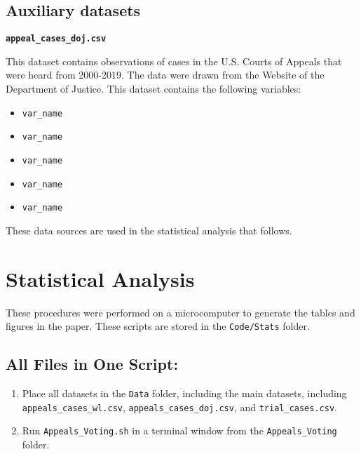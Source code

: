 \documentclass[11pt]{paper}
\begin{document}
\subsection*{Auxiliary datasets}

\noindent\textbf{\texttt{appeal\_cases\_doj.csv}}

This dataset contains observations of cases in the U.S. Courts of Appeals
that were heard from 2000-2019.  
The data were drawn from the Website of the Department of Justice. 
This dataset contains the following variables:

\begin{itemize}

\item \texttt{var\_name} 
\item \texttt{var\_name} 
\item \texttt{var\_name} 
\item \texttt{var\_name} 
\item \texttt{var\_name} 

\end{itemize}


These data sources are used in the statistical analysis that follows. 



\section*{Statistical Analysis}

These procedures were performed on a microcomputer
to generate the tables and figures in the paper.
These scripts are stored in the \texttt{Code/Stats} folder. 

\subsection*{All Files in One Script:}


\begin{enumerate}

\item Place all datasets in the \texttt{Data} folder, 
including the main datasets, including  
\texttt{appeals\_cases\_wl.csv}, \texttt{appeals\_cases\_doj.csv}, 
and \texttt{trial\_cases.csv}. 
 
\item Run \texttt{Appeals\_Voting.sh} in a terminal window from the \texttt{Appeals\_Voting} folder. 

\end{enumerate}
\end{document}
